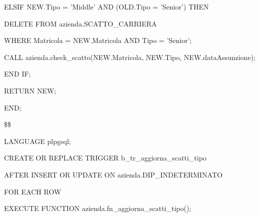 \begin{flushleft}
\begin{description}
\begin{description}
\begin{description}
                                \item ELSIF NEW.Tipo = 'Middle' AND (OLD.Tipo = 'Senior') THEN
                                \begin{description}
                                    \item DELETE FROM azienda.SCATTO\_CARRIERA
                                    \item WHERE Matricola = NEW.Matricola AND Tipo = 'Senior';
                                \end{description}
                                \item CALL azienda.check\_scatto(NEW.Matricola, NEW.Tipo, NEW.dataAssunzione);
                            \end{description}
            
                            \item END IF;
                            \item RETURN NEW;
                    \end{description}
                    \item END;
                    \item \$\$
                    \item LANGUAGE plpgsql;
                \end{description}
            \end{flushleft}
        \normalfont

        \ttfamily
            \begin{flushleft}
                \begin{description}
                    \item CREATE OR REPLACE TRIGGER b\_tr\_aggiorna\_scatti\_tipo
                    \item AFTER INSERT OR UPDATE ON azienda.DIP\_INDETERMINATO
                    \item FOR EACH ROW
                    \item EXECUTE FUNCTION azienda.fn\_aggiorna\_scatti\_tipo();
                \end{description}
            \end{flushleft}
        \normalfont

    \newpage

